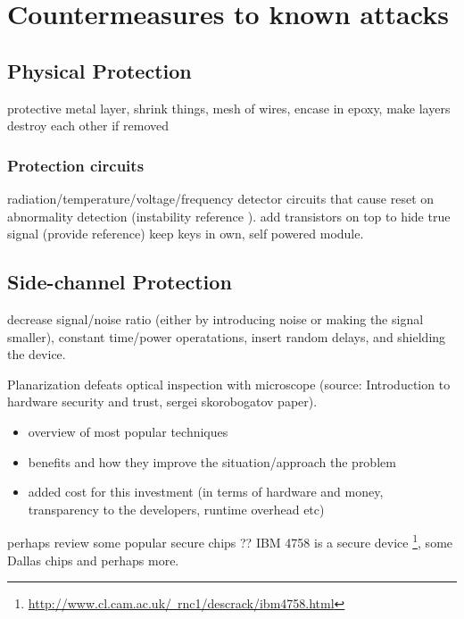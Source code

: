 \section{Countermeasures to known attacks}
\label{sec:defenses}
\subsection{Physical Protection}
protective metal layer, shrink things, mesh of wires, encase in epoxy, make layers destroy each other if removed
\subsubsection{Protection circuits}
radiation/temperature/voltage/frequency detector circuits that cause reset on abnormality detection (instability reference \citep{anderson:cautionary_note}). add transistors on top to hide true signal (provide reference)
 keep keys in own, self powered module.
\subsection{Side-channel Protection}
decrease signal/noise ratio (either by introducing noise or making the signal smaller), constant time/power operatations, insert random delays\citep{sergei:thesis}, \citep{kocher:DPA} and shielding the device.

Planarization defeats optical inspection with microscope (source: Introduction to hardware security and trust, sergei skorobogatov paper).\\
	\begin{itemize}
	\item overview of most popular techniques \\
	\item benefits and how they improve the situation/approach the problem
	\item added cost for this investment (in terms of hardware and money, transparency to the developers, runtime overhead etc)\\
	\end{itemize}
	
	perhaps review some popular secure chips ?? IBM 4758 is a secure device \footnote{\href{http://www.cl.cam.ac.uk/~rnc1/descrack/ibm4758.html}{http://www.cl.cam.ac.uk/~rnc1/descrack/ibm4758.html}}, some Dallas chips and perhaps more.